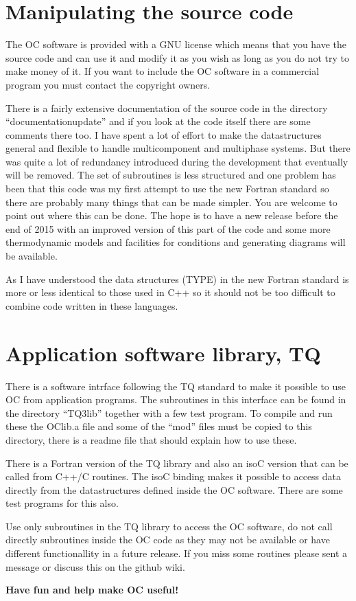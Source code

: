 \documentclass[12pt]{article}
\begin{document}
\section{Manipulating the source code}

The OC software is provided with a GNU license which means that you
have the source code and can use it and modify it as you wish as long
as you do not try to make money of it.  If you want to include the OC
software in a commercial program you must contact the copyright
owners.

There is a fairly extensive documentation of the source code in the
directory ``documentationupdate'' and if you look at the code itself
there are some comments there too.  I have spent a lot of effort to
make the datastructures general and flexible to handle multicomponent
and multiphase systems.  But there was quite a lot of redundancy
introduced during the development that eventually will be removed.
The set of subroutines is less structured and one problem has been
that this code was my first attempt to use the new Fortran standard so
there are probably many things that can be made simpler.  You are
welcome to point out where this can be done.  The hope is to have a
new release before the end of 2015 with an improved version of this
part of the code and some more thermodynamic models and facilities for
conditions and generating diagrams will be available.

As I have understood the data structures (TYPE) in the new Fortran
standard is more or less identical to those used in C++ so it should
not be too difficult to combine code written in these languages.

\section{Application software library, TQ}

There is a software intrface following the TQ standard to make it
possible to use OC from application programs.  The subroutines in this
interface can be found in the directory ``TQ3lib'' together with a few
test program.  To compile and run these the OClib.a file and some of
the ``mod'' files must be copied to this directory, there is a readme
file that should explain how to use these.

There is a Fortran version of the TQ library and also an isoC version
that can be called from C++/C routines.  The isoC binding makes it
possible to access data directly from the datastructures defined
inside the OC software.  There are some test programs for this also.

Use only subroutines in the TQ library to access the OC software, do
not call directly subroutines inside the OC code as they may not be
available or have different functionallity in a future release.  If
you miss some routines please sent a message or discuss this on the
github wiki.

\bigskip

{\large \bf Have fun and help make OC useful!}
\end{document}
